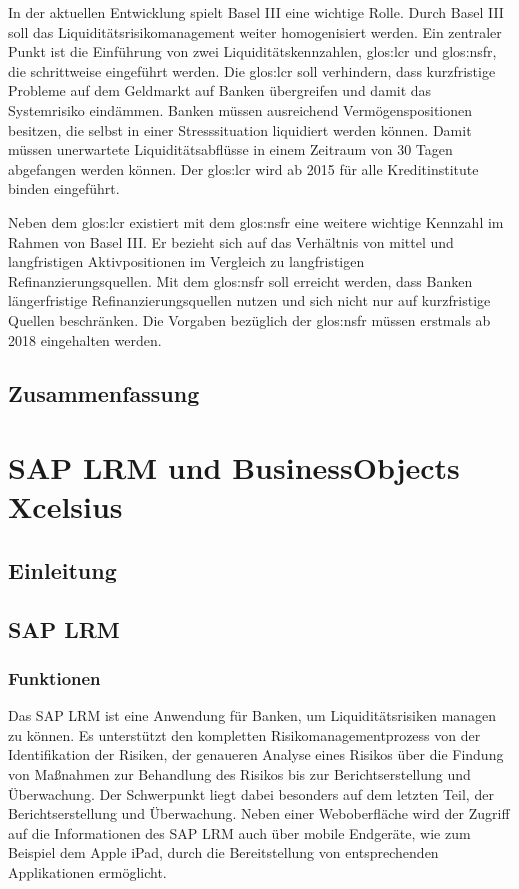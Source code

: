 \begin{onehalfspacing}
In der aktuellen Entwicklung spielt Basel III eine wichtige Rolle. Durch Basel III soll das Liquiditätsrisikomanagement weiter homogenisiert werden. Ein zentraler Punkt ist die Einführung von zwei Liquiditätskennzahlen, \gls{glos:lcr} und \gls{glos:nsfr}, die schrittweise eingeführt werden. Die \gls{glos:lcr} soll verhindern, dass kurzfristige Probleme auf dem Geldmarkt auf Banken übergreifen und damit das Systemrisiko eindämmen. Banken müssen ausreichend Vermögenspositionen besitzen, die selbst in einer Stresssituation liquidiert werden können. Damit müssen unerwartete Liquiditätsabflüsse in einem Zeitraum von 30 Tagen abgefangen werden können. Der \gls{glos:lcr} wird ab 2015 für alle Kreditinstitute binden eingeführt.

Neben dem \gls{glos:lcr} existiert mit dem \gls{glos:nsfr} eine weitere wichtige Kennzahl im Rahmen von Basel III. Er bezieht sich auf das Verhältnis von mittel und langfristigen Aktivpositionen im Vergleich zu langfristigen Refinanzierungsquellen. Mit dem \gls{glos:nsfr} soll erreicht werden, dass Banken längerfristige Refinanzierungsquellen nutzen und sich nicht nur auf kurzfristige Quellen beschränken. Die Vorgaben bezüglich der \gls{glos:nsfr} müssen erstmals ab 2018 eingehalten werden.

\section{Zusammenfassung}
\loreIpsum

\chapter{SAP LRM und BusinessObjects Xcelsius} 
\section{Einleitung}
\loreIpsum
\section{SAP LRM}

\subsection{Funktionen}
Das SAP LRM ist eine Anwendung für Banken, um Liquiditätsrisiken managen zu können. Es unterstützt den kompletten Risikomanagementprozess von der Identifikation der Risiken, der genaueren Analyse eines Risikos über die Findung von Maßnahmen zur Behandlung des Risikos bis zur Berichtserstellung und Überwachung. Der Schwerpunkt liegt dabei besonders auf dem letzten Teil, der Berichtserstellung und Überwachung. Neben einer Weboberfläche wird der Zugriff auf die Informationen des SAP LRM auch über mobile Endgeräte, wie zum Beispiel dem Apple iPad, durch die Bereitstellung von entsprechenden Applikationen ermöglicht.


\end{onehalfspacing}
